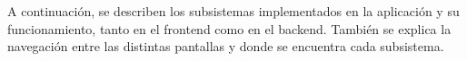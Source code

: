A continuación, se describen los subsistemas implementados en la aplicación y su funcionamiento, tanto en el frontend como en el backend. También 
se explica la navegación entre las distintas pantallas y donde se encuentra cada subsistema.
